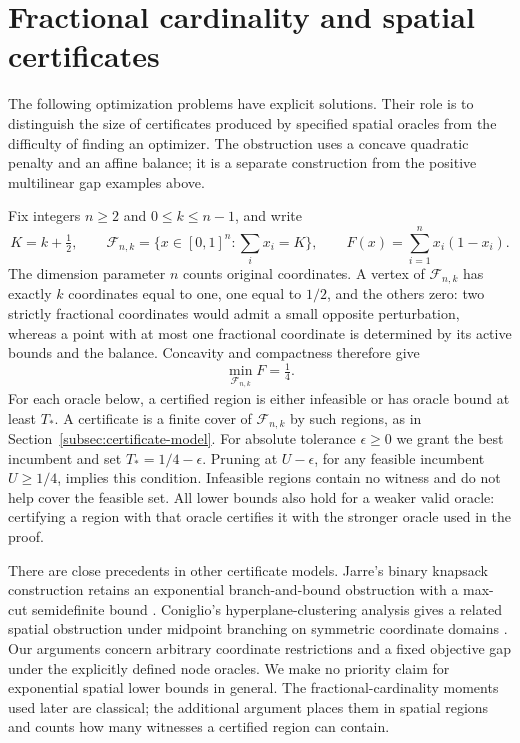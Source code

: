 \section{Fractional cardinality and spatial certificates}
\label{sec:cardinality-spatial}
The following optimization problems have explicit solutions. Their role is
to distinguish the size of certificates produced by specified spatial
oracles from the difficulty of finding an optimizer. The obstruction uses a
concave quadratic penalty and an affine balance; it is a separate
construction from the positive multilinear gap examples above.

Fix integers $n\ge2$ and $0\le k\le n-1$, and write
\begin{equation}\label{eq:cardinality-problem}
 K=k+\tfrac12,\qquad
 \mathcal F_{n,k}=\{x\in[0,1]^n:\textstyle\sum_i x_i=K\},\qquad
 F(x)=\sum_{i=1}^n x_i(1-x_i).
\end{equation}
The dimension parameter $n$ counts original coordinates. A vertex of
$\mathcal F_{n,k}$ has exactly $k$ coordinates equal to one, one equal to
$1/2$, and the others zero: two strictly fractional coordinates would admit
a small opposite perturbation, whereas a point with at most one fractional
coordinate is determined by its active bounds and the balance. Concavity
and compactness therefore give
\begin{equation}\label{eq:cardinality-optimum}
 \min_{\mathcal F_{n,k}}F=\tfrac14.
\end{equation}
For each oracle below, a certified region is either infeasible or has
oracle bound at least $T_*$. A certificate is a finite cover of
$\mathcal F_{n,k}$ by such regions, as in
Section~\ref{subsec:certificate-model}. For absolute tolerance
$\epsilon\ge0$ we grant the best incumbent and set
$T_*=1/4-\epsilon$. Pruning at $U-\epsilon$, for any feasible incumbent
$U\ge1/4$, implies this condition. Infeasible regions contain no witness
and do not help cover the feasible set. All lower bounds also hold for a
weaker valid oracle: certifying a region with that oracle certifies it
with the stronger oracle used in the proof.

There are close precedents in other certificate models. Jarre's binary
knapsack construction retains an exponential branch-and-bound obstruction
with a max-cut semidefinite bound \citep[Sections 2--3]{Jarre2018}.
Coniglio's hyperplane-clustering analysis gives a related spatial
obstruction under midpoint branching on symmetric coordinate domains
\citep[Assumption 1, Propositions 2--4, Appendix C in the review version]{Coniglio2026}.
Our arguments concern arbitrary coordinate restrictions and a fixed
objective gap under the explicitly defined node oracles. We make no
priority claim for exponential spatial lower bounds in general. The
fractional-cardinality moments used later are classical; the additional
argument places them in spatial regions and counts how many witnesses a
certified region can contain.

